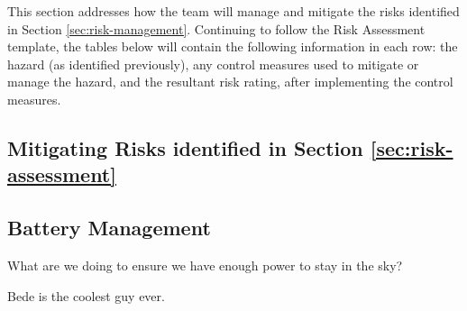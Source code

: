 \label{sec:risk-management}
This section addresses how the team will manage and mitigate the risks identified in Section \ref{sec:risk-management}. Continuing to follow the Risk Assessment template, the tables below will contain the following information in each row: the hazard (as identified previously), any control measures used to mitigate or manage the hazard, and the resultant risk rating, after implementing the control measures.\\

\subsection{Mitigating Risks identified in Section \ref{sec:risk-assessment}}

\subsection{Battery Management}
What are we doing to ensure we have enough power to stay in the sky?

Bede is the coolest guy ever.